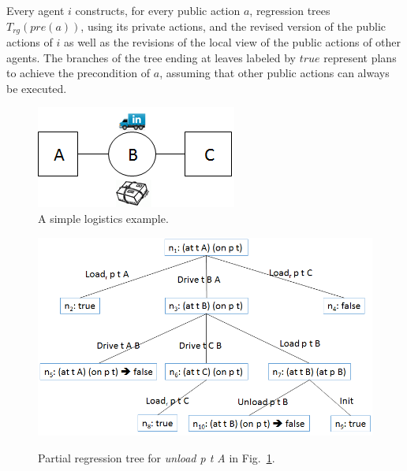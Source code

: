 \documentclass[letterpaper]{article}
\theoremstyle{definition}
\begin{document}
Every agent $i$ constructs, for every public action $a$, regression trees $T_{rg}(pre(a))$, using its private actions, and the revised version of the public actions of $i$ as well as the revisions of the local view of the public actions of other agents. The branches of the tree ending at leaves labeled by $true$ represent plans to achieve the precondition of $a$, assuming that other public actions can always be executed. 



\begin{figure}
\centering
\includegraphics[scale=0.7]{SmallLogistics}
\caption{A simple logistics example.}
\label{fig:small}
\vspace{-0.3cm}
\end{figure}


\begin{figure}
\centering
\includegraphics[scale=0.4]{RegressionTree}
\label{fig:tree}
\caption{Partial regression tree for {\em unload p t A} in Fig.~\ref{fig:small}.}
\vspace{-0.3cm}
\end{figure}
\end{document}
